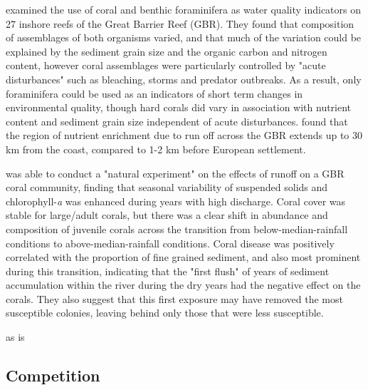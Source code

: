 \documentclass[11pt,a4paper]{article}
\begin{document}
\cite{Uthicke2010} examined the use of coral and benthic foraminifera as water quality indicators on 27 inshore reefs of the Great Barrier Reef (GBR).
 They found that composition of assemblages of both organisms varied, and that much of the variation could be explained by the sediment grain size and the organic carbon and nitrogen content, however coral assemblages were particularly controlled by "acute disturbances" such as bleaching, storms and predator outbreaks.
  As a result, only foraminifera could be used as an indicators of short term changes in environmental quality, though hard corals did vary in association with nutrient content and sediment grain size independent of acute disturbances.
 \cite{Wooldridge2006} found that the region of nutrient enrichment due to run off across the GBR extends up to 30 km from the coast, compared to 1-2 km before European settlement.

\cite{Thompson2014} was able to conduct a "natural experiment" on the effects of runoff on a GBR coral community, finding that seasonal variability of suspended solids and chlorophyll-\textit{a} was enhanced during years with high discharge.
 Coral cover was stable for large/adult corals, but there was a clear shift in abundance and composition of juvenile corals across the transition from below-median-rainfall conditions to above-median-rainfall conditions.
  Coral disease was positively correlated with the proportion of fine grained sediment, and also most prominent during this transition, indicating that the "first flush" of years of sediment accumulation within the river during the dry years had the negative effect on the corals.
 They also suggest that this first exposure may have removed the most susceptible colonies, leaving behind only those that were less susceptible.



as is \cite{Erftemeijer2012}


\subsection{Competition}

\end{document}
